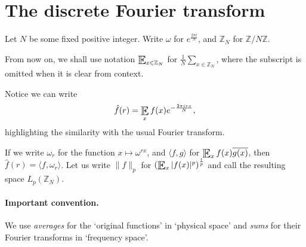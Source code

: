 \documentclass{article}
\DeclareMathOperator*{\E}{\scalerel*{\mathbb{E}}{\textstyle\sum}}
\newcommand{\1}[1]{\mathbbm{1}_{#1}}
\begin{document}
\maketitle

\tableofcontents

\clearpage
\section{The discrete Fourier transform}
Let $N$ be some fixed positive integer. Write $\omega$ for $e^{\frac{2\pi i}{N}}$, and $\mathbb{Z}_N$ for $\mathbb{Z}/N\mathbb{Z}$.


\begin{notation}
  From now on, we shall use notation $\E_{x \in \mathbb{Z}_N}$ for $\frac{1}{N} \sum_{x \in \mathbb{Z}_N}$, where the subscript is omitted when it is clear from context.
\end{notation}

Notice we can write
\begin{equation*}
  \hat{f}(r) = \E_x f(x) e^{-\frac{2 \pi i r x}{N}},
\end{equation*}
highlighting the similarity with the usual Fourier transform.

If we write $\omega_r$ for the function $x \mapsto \omega^{r x}$, and $\langle f, g \rangle$ for $\E_x f(x) \overline{g(x)}$, then $\hat{f}(r) = \langle f, \omega_r \rangle$.
Let us write $\| f \|_p$ for $\left(\E_x |f(x)|^p\right)^{\frac{1}{p}}$ and call the resulting space $L_p(\mathbb{Z}_N)$.

\paragraph{Important convention.} We use \emph{averages} for the `original functions' in `physical space' and \emph{sums} for their Fourier transforms in `frequency space'.
\end{document}
